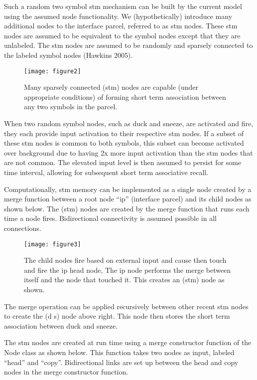 \documentclass{clv3}
\begin{document}
Such a random two symbol stm mechanism can be built by the current model using the assumed node functionality.   We (hypothetically) introduce many additional nodes to the interface parcel, referred to as stm nodes.  These stm nodes are assumed to be equivalent to the symbol nodes except that they are unlabeled.  The stm nodes are assumed to be randomly and sparsely  connected to the labeled symbol nodes (Hawkins 2005).

 \begin{figure}
\texttt{[image: figure2]}
\caption{Many sparsely connected (stm) nodes are capable (under appropriate conditions) of forming short term association between any two symbols in the parcel. }
\end{figure}

When two random symbol nodes, such as duck and sneeze, are activated and fire, they each provide input activation to their respective stm nodes.  If a subset of these stm nodes is common to both symbols, this subset can become activated over background due to having 2x more input activation than the stm nodes that are not common.  The elevated input level is then assumed to  persist for some time interval, allowing for subsequent short term associative recall.   


Computationally, stm memory can be implemented as a single node created by a merge function between a root node “ip” (interface parcel) and its child nodes as shown below.   The (stm) nodes are created by the merge function that runs each time a node fires.  Bidirectional connectivity is assumed possible in all connections.

 \begin{figure}
\texttt{[image: figure3]}
\caption{The child nodes fire based on external input and cause then touch and fire the ip head node,  The ip node performs the merge between itself and the node that touched it.  This creates an (stm) node as shown. }
\end{figure}

  
The merge operation can be applied recursively between other recent stm nodes to create the (d s) node above right.   This node then stores the short term association between duck and sneeze.  



The stm nodes are created at run time using a merge constructor function of the Node class as shown below.   This function takes two nodes as input, labeled “head” and “copy”.   Bidirectional links are set up between the head and copy nodes in the merge constructor function.
\end{document}

